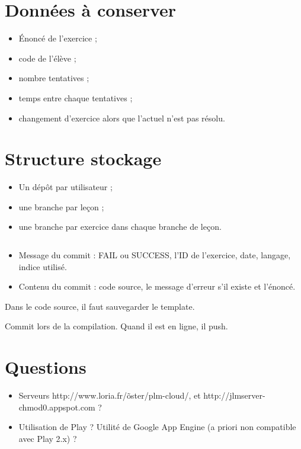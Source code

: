 \documentclass[12pt,a4paper]{article}
\author{HUGUENIN Cédric}
\begin{document}

\section{Données à conserver}

\begin{itemize}
\item \'Enoncé de l'exercice ;
\item code de l'élève ;
\item nombre tentatives ;
\item temps entre chaque tentatives ;
\item changement d'exercice alors que l'actuel n'est pas résolu.
\end{itemize}

\section{Structure stockage}

\begin{itemize}
\item Un dépôt par utilisateur ;
\item une branche par leçon ;
\item une branche par exercice dans chaque branche de leçon.
\end{itemize}
$ $\\
\begin{itemize}
\item Message du commit : FAIL ou SUCCESS, l'ID de l'exercice, date, langage, indice utilisé.
\item Contenu du commit : code source, le message d'erreur s'il existe et l'énoncé.
\end{itemize}

Dans le code source, il faut sauvegarder le template.

Commit lors de la compilation.
Quand il est en ligne, il push.

\section{Questions}

\begin{itemize}
\item Serveurs http://www.loria.fr/\~oster/plm-cloud/, et http://jlmserver-chmod0.appspot.com ?
\item Utilisation de Play ? Utilité de Google App Engine (a priori non compatible avec Play 2.x) ?
\end{itemize}
\end{document}

